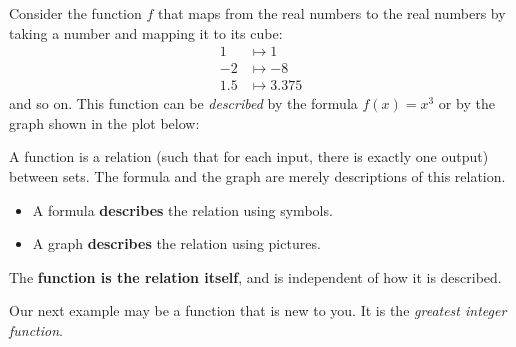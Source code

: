 \documentclass{ximera}
\begin{document}
\begin{example}
Consider the function $f$ that maps from the real numbers to the real
numbers by taking a number and mapping it to its cube:
\begin{align*}
1 &\mapsto 1\\
-2 &\mapsto -8\\
1.5 &\mapsto 3.375
\end{align*}
and so on. This function can be \textit{described} by the formula
$f(x)=x^3$ or by the graph shown in the plot below:

\begin{image}
\end{image}
\end{example}

\begin{warning}
A function is a relation (such that for each input, there is exactly
one output) between sets. The formula and the graph are merely
descriptions of this relation.
\begin{itemize}
\item A formula \textbf{describes} the relation using symbols.
\item A graph \textbf{describes} the relation using pictures. 
\end{itemize}
The \textbf{function is the relation itself}, and is independent of how
it is described.
\end{warning}

Our next example may be a function that is new to you. It is the
\textit{greatest integer function}.
\end{document}
